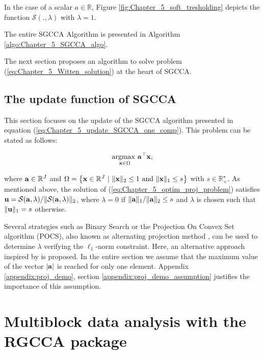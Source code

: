 \documentclass[
]{jss}
\begin{document}
In the case of a scalar \(a\in\mathbb{R}\), Figure
\ref{fig:Chapter_5_soft_tresholding} depicts the function
\(\mathcal{S}(., \lambda)\) with \(\lambda=1\).

The entire SGCCA Algorithm is presented in Algorithm
\ref{algo:Chapter_5_SGCCA_algo}.

The next section proposes an algorithm to solve problem
(\ref{eq:Chapter_5_Witten_solution}) at the heart of SGCCA.

\hypertarget{the-update-function-of-sgcca}{%
\subsection{The update function of
SGCCA}\label{the-update-function-of-sgcca}}

This section focuses on the update of the SGCCA algorithm presented in
equation (\ref{eq:Chapter_5_update_SGCCA_one_comp}). This problem can be
stated as follows:

\begin{equation}
        \underset{\mathbf{x}\in\Omega}{\mathrm{argmax}~} 
        \mathbf{a}^\top\mathbf{x},
    \label{eq:Chapter_5_optim_proj_problem}
\end{equation}

where \(\mathbf{a}\in\mathbb{R}^{J}\) and
\(\Omega = \left\lbrace\mathbf{x} \in \mathbb{R}^{J}~|~\Vert\mathbf{x}\Vert_2 \leq 1 ~\text{and}~\Vert\mathbf{x}\Vert_1 \leq s\right\rbrace\)
with \(s\in\mathbb{R}_+^\star\). As mentioned above, the solution of
(\ref{eq:Chapter_5_optim_proj_problem}) satisfies
\(\mathbf{u} = \mathcal{S}(\mathbf{a}, \lambda)/\Vert \mathcal{S}(\mathbf{a}, \lambda)\Vert_2\),
where \(\lambda = 0\) if \(\Vert\mathbf{a}\Vert_1/\Vert\mathbf{a}\Vert_2\leq s\)
and \(\lambda\) is chosen such that \(\Vert\mathbf{u}\Vert_1 = s\)
otherwise.

Several strategies such as Binary Search or the Projection On Convex Set
algorithm (POCS), also known as alternating projection method
\citep{Boyd2003}, can be used to determine \(\lambda\) verifying the
\(\ell_1\)-norm constraint. Here, an alternative approach inspired by
\citep{vandenBerg2008} is proposed. In the entire section we assume that
the maximum value of the vector \(\vert \mathbf{a} \vert\) is reached for
only one element. Appendix \ref{appendix:proj_demo}, section
\ref{appendix:proj_demo_assumption} justifies the importance of this
assumption.

\hypertarget{multiblock-data-analysis-with-the-rgcca-package}{%
\section{Multiblock data analysis with the RGCCA
package}\label{multiblock-data-analysis-with-the-rgcca-package}}
\end{document}
